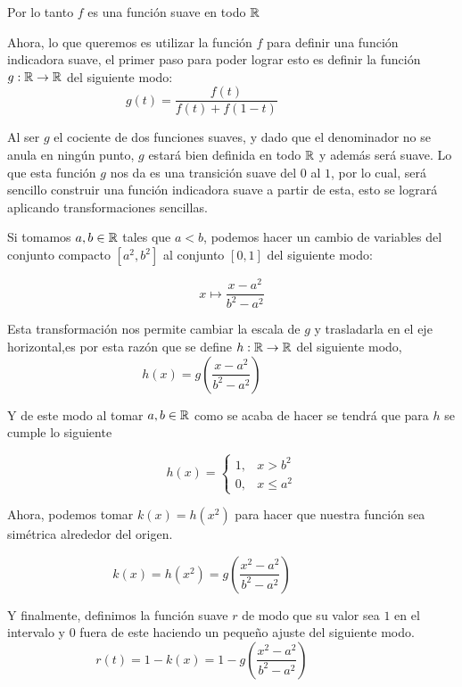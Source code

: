 \begin{example}
	Por lo tanto $f$ es una función suave en todo $\mathbb{R}$

	Ahora, lo que queremos es utilizar la función $f$ para definir una función indicadora suave, el primer paso para poder lograr esto es definir la función $g: \mathbb{R} \to \mathbb{R}$ del siguiente modo:
	\[
		g(t) = \frac{f(t)}{f(t)+f(1-t)}
		\qquad \qquad
		\begin{gathered}
			
		\end{gathered}
	\]


	Al ser $g$ el cociente de dos funciones suaves, y dado que el denominador no se anula en ningún punto, $g$ estará bien definida en todo $\mathbb{R}$ y además será suave. Lo que esta función $g$ nos da es una transición suave del $0$ al $1$, por lo cual, será sencillo construir una función indicadora suave a partir de esta, esto se logrará aplicando transformaciones sencillas.

	Si tomamos $a,b \in \mathbb{R}$ tales que $a<b$, podemos hacer un cambio de variables del conjunto compacto $[a^2,b^2]$ al conjunto $[0,1]$ del siguiente modo:

	\[
		x \mapsto \frac{x - a^2}{b^2 - a^2}
	\]

	Esta transformación nos permite cambiar la escala de $g$  y trasladarla en el eje horizontal,es por esta razón que se define $h: \mathbb{R} \to \mathbb{R}$ del siguiente modo,
	\[
		h(x) = g\left(\frac{x - a^2}{b^2 - a^2}\right)
		\qquad \qquad
		\begin{gathered}
			
		\end{gathered}
	\]

	Y de este modo al tomar $a,b \in \mathbb{R}$ como se acaba de hacer se tendrá que para $h$ se cumple lo siguiente

	\[
		h(x) = \begin{cases}
			1, & x > b^2    \\
			0, & x \leq a^2
		\end{cases}
	\]

	Ahora, podemos tomar $k(x)=h(x^2)$ para hacer que nuestra función sea simétrica alrededor del origen.

	\[
		k(x) = h(x^2) = g\left(\frac{x^2 - a^2}{b^2 - a^2}\right)
		\qquad \qquad
		\begin{gathered}
			
		\end{gathered}
	\]



	Y finalmente, definimos la función suave $r$ de modo que su valor sea $1$ en el intervalo y $0$ fuera de este haciendo un pequeño ajuste del siguiente modo.
	\[
		r(t) = 1 - k(x) = 1 - g\left(\frac{x^2 - a^2}{b^2 - a^2}\right)
		\qquad \qquad
		\begin{gathered}
			
		\end{gathered}
	\]


\end{example}
